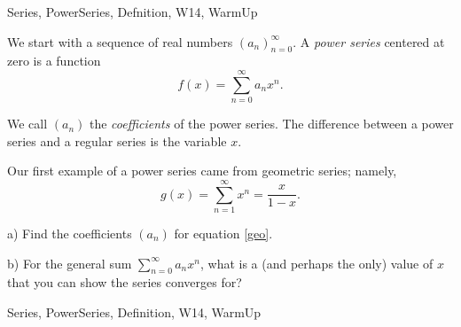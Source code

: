 \begin{tagblock}{Series, PowerSeries, Defnition, W14, WarmUp}
\begin{question}

We start with a sequence of real numbers $(a_n)_{n=0}^{\infty}$. A \textit{power series} centered at zero is a function 
\[
f(x)=\sum_{n=0}^{\infty}a_nx^n.
\]

\bigskip

We call $(a_n)$ the \textit{coefficients} of the power series. The difference between a power series and a regular series is the variable $x$. 

Our first example of a power series came from geometric series; namely,
\begin{equation}\label{geo}
g(x)=\sum_{n=1}^{\infty}x^n=\frac x {1-x}.
\end{equation}


\bigskip

a) Find the coefficients $(a_n)$ for equation \eqref{geo}.
 
\bigskip

b) For the general sum $\displaystyle\sum_{n=0}^{\infty}a_nx^n$, what is a (and perhaps the only) value of $x$ that you can show the series converges for?
	
	
\begin{tags}
	    Series, PowerSeries, Definition, W14, WarmUp
\end{tags}
	
\begin{diary}
	    
\end{diary}
	
\begin{solution}
	   
\end{solution}
	
\end{question}

\end{tagblock}

 

